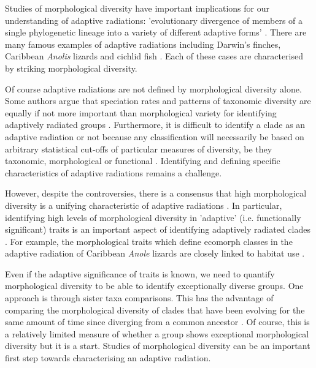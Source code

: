 	Studies of morphological diversity have important implications for our understanding of adaptive radiations: 'evolutionary divergence of members of a single phylogenetic lineage into a variety of different adaptive forms' \citep[Futuyama 1998, cited by][]{Losos2010}.
	There are many famous examples of adaptive radiations including Darwin's finches, Caribbean \textit{Anolis} lizards and cichlid fish \citep{Gavrilets2009}. Each of these cases are characterised by striking morphological diversity.
	
	Of course adaptive radiations are not defined by morphological diversity alone. Some authors argue that speciation rates and patterns of taxonomic diversity are equally if not more important than morphological variety for identifying adaptively radiated groups \citep{Glor2010, Losos2010a}. Furthermore, it is difficult to identify a clade as an adaptive radiation or not because any classification will necessarily be based on arbitrary statistical cut-offs of particular measures of diversity, be they taxonomic, morphological or functional \citep{Olson2009}. Identifying and defining specific characteristics of adaptive radiations remains a challenge.
	
		
	However, despite the controversies, there is a consensus that high morphological diversity is a unifying characteristic of adaptive radiations \citep{Losos2010a, Olson2009}. In particular, identifying high levels of morphological diversity in 'adaptive' (i.e. functionally significant) traits is an important aspect of identifying adaptively radiated clades \citep{Losos2010a}. For example, the morphological traits which define ecomorph classes in the adaptive radiation of Caribbean \textit{Anole} %
	lizards are closely linked to habitat use \citep{Losos1998}.

	
	Even if the adaptive significance of traits is known, we need to quantify morphological diversity to be able to identify exceptionally diverse groups. One approach is through sister taxa comparisons. This has the advantage of comparing the morphological diversity of clades that have been evolving for the same amount of time since diverging from a common ancestor \citep{Losos2002}. Of course, this is a relatively limited measure of whether a group shows exceptional morphological diversity but it is a start.
	Studies of morphological diversity can be an important first step towards characterising an adaptive radiation.
